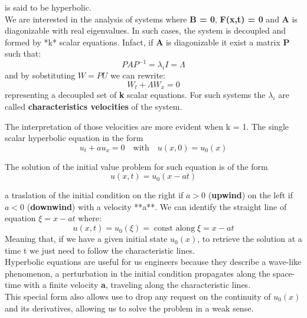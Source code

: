 \documentclass{report}
\begin{document}
is said to be hyperbolic. \\

We are interested in the analysis of systems where
\textbf{B = 0}, \textbf{F(x,t) = 0} and \textbf{A} is diagonizable with real eigenvalues. In such cases, the system is decoupled and formed by *k* scalar equations.
Infact, if \textbf{A} is diagonizable it exist a matrix \textbf{P} such that:
\begin{equation*}
    PAP^{-1} = \lambda_iI = \Lambda
\end{equation*}
and by sobstituting $ W = PU$ we can rewrite:
\begin{equation*}
    W_t + \Lambda W_x = 0
\end{equation*}
representing a decoupled set of \textbf{k} scalar equations. For such systems the $\lambda_i$ are called \textbf{characteristics velocities} of the system.

The interpretation of those velocities are more evident when k = 1.
The single scalar hyperbolic equation in the form
\begin{equation*}
    u_t + au_x = 0   \quad \textrm{with} \quad u(x,0) = u_0(x)
\end{equation*}

The solution of the initial value problem for such equation is of the form
\begin{equation*}
    u(x,t) = u_0(x-at)
\end{equation*}

a traslation of the initial condition on the right if $a>0$ (\textbf{upwind}) on the left if $a<0$ (\textbf{downwind}) with a velocity **a**. We can identify the straight line of equation
$ \xi = x - at$ where:
\begin{equation*}
    u(x,t) = u_0(\xi) = \; \textrm{const along} \;\xi = x - at
\end{equation*}
Meaning that, if we have a given initial state $u_0(x)$, to retrieve the solution at a time t we just need to follow the characteristic lines.\\
Hyperbolic equations are useful for us engineers because they describe a wave-like phenomenon, a perturbation in the initial condition
propagates along the space-time with a finite velocity \textbf{a}, traveling along the characteristic lines.\\
This special form also allows use to drop any request on the continuity of $u_0(x)$ and its derivatives, allowing us to solve the problem in a weak sense.
\end{document}
